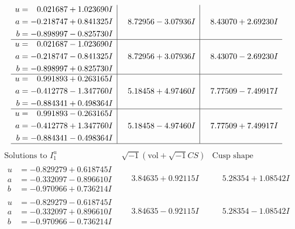 \documentclass[1p]{elsarticle_modified}
\theoremstyle{definition}
\newcommand{\I}{\sqrt{-1}}
\begin{document}
$$\begin{array}{c|c|c}
\begin{aligned}
u &= \phantom{-}0.021687 + 1.023690 I \\
a &= -0.218747 + 0.841325 I \\
b &= -0.898997 - 0.825730 I\end{aligned}
 & \phantom{-}8.72956 - 3.07936 I & \phantom{-}8.43070 + 2.69230 I \\ \hline\begin{aligned}
u &= \phantom{-}0.021687 - 1.023690 I \\
a &= -0.218747 - 0.841325 I \\
b &= -0.898997 + 0.825730 I\end{aligned}
 & \phantom{-}8.72956 + 3.07936 I & \phantom{-}8.43070 - 2.69230 I \\ \hline\begin{aligned}
u &= \phantom{-}0.991893 + 0.263165 I \\
a &= -0.412778 - 1.347760 I \\
b &= -0.884341 + 0.498364 I\end{aligned}
 & \phantom{-}5.18458 + 4.97460 I & \phantom{-}7.77509 - 7.49917 I \\ \hline\begin{aligned}
u &= \phantom{-}0.991893 - 0.263165 I \\
a &= -0.412778 + 1.347760 I \\
b &= -0.884341 - 0.498364 I\end{aligned}
 & \phantom{-}5.18458 - 4.97460 I & \phantom{-}7.77509 + 7.49917 I\\
 \hline 
 \end{array}$$\newpage$$\begin{array}{c|c|c}  
\text{Solutions to }I^u_{1}& \I (\text{vol} + \sqrt{-1}CS) & \text{Cusp shape}\\
 \hline 
\begin{aligned}
u &= -0.829279 + 0.618745 I \\
a &= -0.332097 - 0.896610 I \\
b &= -0.970966 + 0.736214 I\end{aligned}
 & \phantom{-}3.84635 + 0.92115 I & \phantom{-}5.28354 + 1.08542 I \\ \hline\begin{aligned}
u &= -0.829279 - 0.618745 I \\
a &= -0.332097 + 0.896610 I \\
b &= -0.970966 - 0.736214 I\end{aligned}
 & \phantom{-}3.84635 - 0.92115 I & \phantom{-}5.28354 - 1.08542 I \\ \hline\begin{aligned}

\end{aligned}
\end{array}$$
\end{document}
